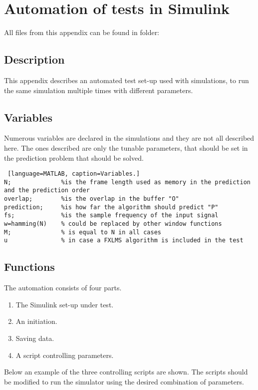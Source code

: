 \section{Automation of tests in Simulink} \label{sec:SimulinkAuto}

All files from this appendix can be found in folder: \\

\subsection{Description}
This appendix describes an automated test set-up used with simulations, to run the same simulation multiple times with different parameters. 
\subsection{Variables}
Numerous variables are declared in the simulations and they are not all described here. The ones described are only the tunable parameters, that should be set in the prediction problem that should be solved. 
\begin{lstlisting} [language=MATLAB, caption=Variables.]
N; 				%is the frame length used as memory in the prediction and the prediction order
overlap;		%is the overlap in the buffer "O"
prediction; 	%is how far the algorithm should predict "P"
fs; 			%is the sample frequency of the input signal 
w=hamming(N)	% could be replaced by other window functions
M;				% is equal to N in all cases
u 				% in case a FXLMS algorithm is included in the test
\end{lstlisting}

\subsection{Functions}
 The automation consists of four parts. 
\begin{enumerate}
	\item The Simulink set-up under test. 
	\item An initiation. 
	\item Saving data.
	\item A script controlling parameters. 
\end{enumerate}  

Below an example of the three controlling scripts are shown. The  scripts should be modified to run the simulator using the desired combination of parameters.

